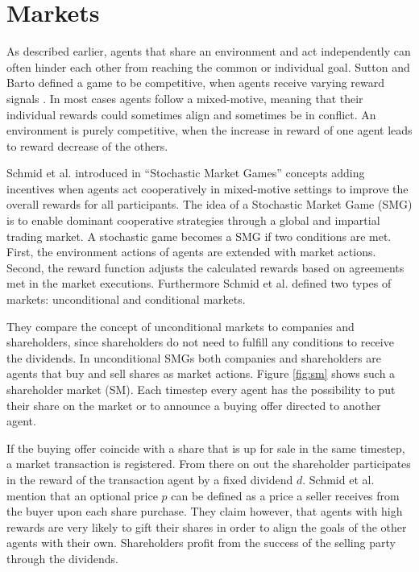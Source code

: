 \section{Markets}\label{market}
As described earlier, agents that share an environment and act independently can often hinder each other from reaching the common or individual goal. Sutton and Barto defined a game to be competitive, when agents receive varying reward signals \cite{suba18}. In most cases agents follow a mixed-motive, meaning that their individual rewards could sometimes align and sometimes be in conflict. An environment is purely competitive, when the increase in reward of one agent leads to reward decrease of the others.

Schmid et al. introduced in ``Stochastic Market Games'' \cite{scbe21} concepts adding incentives when agents act cooperatively in mixed-motive settings to improve the overall rewards for all participants. The idea of a Stochastic Market Game (SMG) is to enable dominant cooperative strategies through a global and impartial trading market. A stochastic game becomes a SMG if two conditions are met. First, the environment actions of agents are extended with market actions. Second, the reward function adjusts the calculated rewards based on agreements met in the market executions. Furthermore Schmid et al. defined two types of markets: unconditional and conditional markets.

They compare the concept of unconditional markets to companies and shareholders, since shareholders do not need to fulfill any conditions to receive the dividends. In unconditional SMGs both companies and shareholders are agents that buy and sell shares as market actions. Figure \ref{fig:sm} shows such a shareholder market (SM). Each timestep every agent has the possibility to put their share on the market or to announce a buying offer directed to another agent.

If the buying offer coincide with a share that is up for sale in the same timestep, a market transaction is registered. From there on out the shareholder participates in the reward of the transaction agent by a fixed dividend $d$. Schmid et al. mention that an optional price $p$ can be defined as a price a seller receives from the buyer upon each share purchase. They claim however, that agents with high rewards are very likely to gift their shares in order to align the goals of the other agents with their own. Shareholders profit from the success of the selling party through the dividends.

